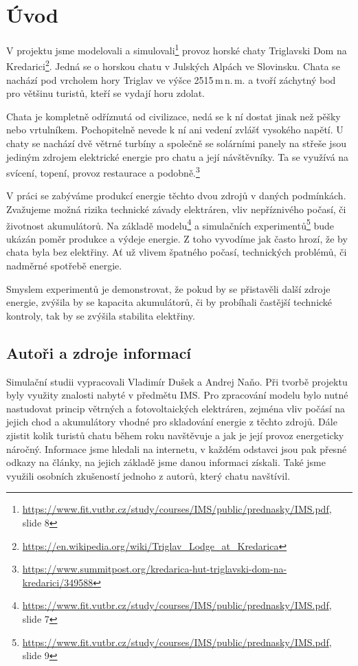 \section{Úvod}

V projektu jsme modelovali a simulovali\footnote{\url{https://www.fit.vutbr.cz/study/courses/IMS/public/prednasky/IMS.pdf}, slide 8} provoz horské chaty Triglavski Dom na Kredarici\footnote{\url{https://en.wikipedia.org/wiki/Triglav_Lodge_at_Kredarica}}. Jedná se o horskou chatu v Julských Alpách ve Slovinsku. Chata se nachází pod vrcholem hory Triglav ve výšce 2515\,m\,n.\,m. a tvoří záchytný bod pro většinu turistů, kteří se vydají horu zdolat.

Chata je kompletně odříznutá od civilizace, nedá se k ní dostat jinak než pěšky nebo vrtulníkem. Pochopitelně nevede k ní ani vedení zvlášť vysokého napětí. U chaty se nachází dvě větrné turbíny a společně se solárními panely na střeše jsou jediným zdrojem elektrické energie pro chatu a její návštěvníky. Ta se využívá na svícení, topení, provoz restaurace a podobně.\footnote{\url{https://www.summitpost.org/kredarica-hut-triglavski-dom-na-kredarici/349588}}

V práci se zabýváme produkcí energie těchto dvou zdrojů v daných podmínkách. Zvažujeme možná rizika technické závady elektráren, vliv nepříznivého počasí, či životnost akumulátorů. Na základě modelu\footnote{\url{https://www.fit.vutbr.cz/study/courses/IMS/public/prednasky/IMS.pdf}, slide 7} a simulačních experimentů\footnote{\url{https://www.fit.vutbr.cz/study/courses/IMS/public/prednasky/IMS.pdf}, slide 9} bude ukázán poměr produkce a výdeje energie. Z toho vyvodíme jak často hrozí, že by chata byla bez elektřiny. Ať už vlivem špatného počasí, technických problémů, či nadměrné spotřebě energie.

Smyslem experimentů je demonstrovat, že pokud by se přistavěli další zdroje energie, zvýšila by se kapacita akumulátorů, či by probíhali častější technické kontroly, tak by se zvýšila stabilita elektřiny.



\subsection{Autoři a zdroje informací}

Simulační studii vypracovali Vladimír Dušek a Andrej Naňo. Při tvorbě projektu byly využity znalosti nabyté v předmětu IMS. Pro zpracování modelu bylo nutné nastudovat princip větrných a fotovoltaických elektráren, zejména vliv počásí na jejich chod a akumulátory vhodné pro skladování energie z těchto zdrojů. Dále zjistit kolik turistů chatu během roku navštěvuje a jak je její provoz energeticky náročný. Informace jsme hledali na internetu, v každém odstavci jsou pak přesné odkazy na články, na jejich základě jsme danou informaci získali. Také jsme využili osobních zkušeností jednoho z autorů, který chatu navštívil.




